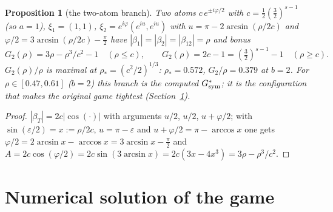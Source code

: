 \documentclass[11pt]{article}
\newtheorem{proposition}[theorem]{Proposition}
\theoremstyle{definition}
\begin{document}
\begin{proposition}[the two-atom branch]\label{prop:two}
Two atoms $c\,e^{\pm i\varphi/2}$ with $c=\frac12(\frac32)^{s-1}$ (so $a=1$), $\xi_1=(1,1)$, $\xi_2=e^{i\varphi}(e^{iu},e^{iu})$ with $u=\pi-2\arcsin(\rho/2c)$ and
$\varphi/2=3\arcsin(\rho/2c)-\frac\pi2$ have $|\beta_1|=|\beta_2|=|\beta_{12}|=\rho$ and bonus
\[G_2(\rho)=3\rho-\rho^3/c^2-1\quad(\rho\le c),\qquad G_2(\rho)=2c-1=(\tfrac32)^{s-1}-1\quad(\rho\ge c).\]
$G_2(\rho)/\rho$ is maximal at $\rho_*=(c^2/2)^{1/3}$: $\rho_*=0.572$, $G_2/\rho=0.379$ at $b=2$.  For $\rho\in[0.47,0.61]$ ($b=2$) this branch is the computed
$G^*_{\rm sym}$; it is the configuration that makes the original game tightest (Section~\ref{sec:num}).
\end{proposition}
\begin{proof}
$|\beta_T|=2c|\cos(\cdot)|$ with arguments $u/2$, $u/2$, $u+\varphi/2$; with $\sin(\varepsilon/2)=x:=\rho/2c$, $u=\pi-\varepsilon$ and $u+\varphi/2=\pi-\arccos x$ one gets
$\varphi/2=2\arcsin x-\arccos x=3\arcsin x-\frac\pi2$ and $A=2c\cos(\varphi/2)=2c\sin(3\arcsin x)=2c(3x-4x^3)=3\rho-\rho^3/c^2$.
\end{proof}

\section{Numerical solution of the game}\label{sec:num}
\end{document}
